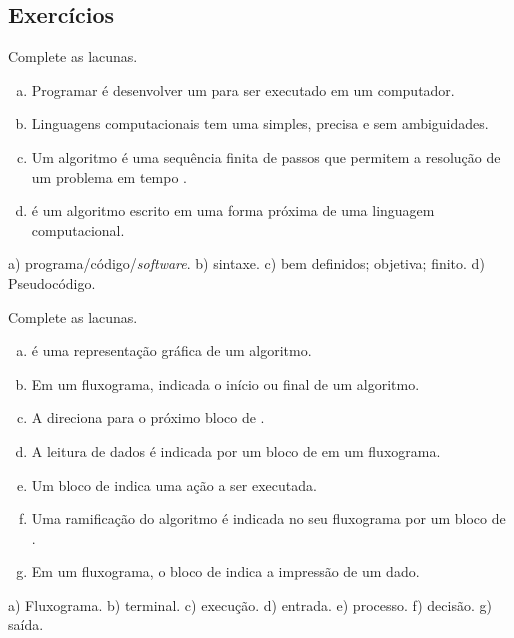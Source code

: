 \subsection{Exercícios}

\begin{exer}
  Complete as lacunas.
  \begin{enumerate}[a)]
    \item Programar é desenvolver um \underline{} para ser executado em um computador.
    \item Linguagens computacionais tem uma \underline{\phantom{sintaxe}} simples, precisa e sem ambiguidades.
    \item Um algoritmo é uma sequência finita de passos \underline{\phantom{bem definidos}} que permitem a resolução \underline{\phantom{objetiva}} de um problema em tempo \underline{\phantom{finito}}.
    \item \underline{\phantom{Pseudocódigo}} é um algoritmo escrito em uma forma próxima de uma linguagem computacional.
  \end{enumerate}
\end{exer}
\begin{resp}
  a) programa/código/\textit{software}. b) sintaxe. c) bem definidos; objetiva; finito. d) Pseudocódigo.
\end{resp}

\begin{exer}
  Complete as lacunas.
  \begin{enumerate}[a)]
    \item \underline{\phantom{Fluxograma}} é uma representação gráfica de um algoritmo.
    \item Em um fluxograma, \underline{\phantom{terminal}} indicada o início ou final de um algoritmo.
    \item A \underline{\phantom{linha de fluxo}} direciona para o próximo bloco de \underline{\phantom{execução}}.
    \item A leitura de dados é indicada por um bloco de \underline{\phantom{entrada}} em um fluxograma.
    \item Um bloco de \underline{\phantom{processo}} indica uma ação a ser executada.
    \item Uma ramificação do algoritmo é indicada no seu fluxograma por um bloco de \underline{\phantom{decisão}}.
    \item Em um fluxograma, o bloco de \underline{\phantom{saída}} indica a impressão de um dado.
  \end{enumerate} 
\end{exer}
\begin{resp}
  a) Fluxograma. b) terminal. c) execução. d) entrada. e) processo. f) decisão. g) saída.
\end{resp}

